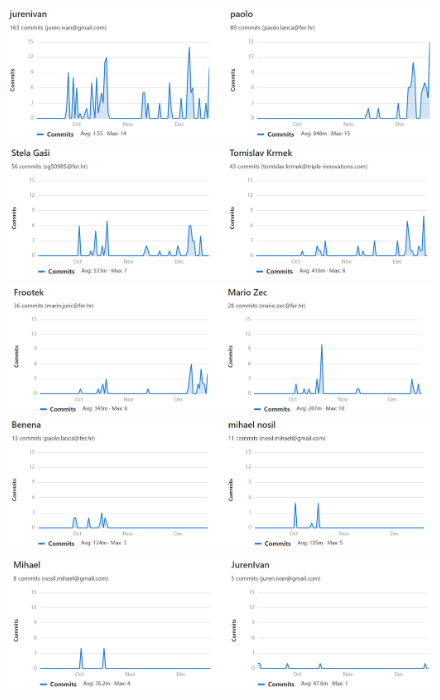 		\begin{figure}[H]
			\begin{center}
				\includegraphics[width=15cm]{slike/dijagrampregledapromjena1.PNG}
				\includegraphics[width=15cm]{slike/dijagrampregledapromjena2.PNG}
				\includegraphics[width=15cm]{slike/dijagrampregledapromjena3.PNG}
				\includegraphics[width=15cm]{slike/dijagrampregledapromjena4.PNG}
				\includegraphics[width=15cm]{slike/dijagrampregledapromjena5.PNG}
			\end{center}
			\label{fig:dijapre}
		\end{figure}
